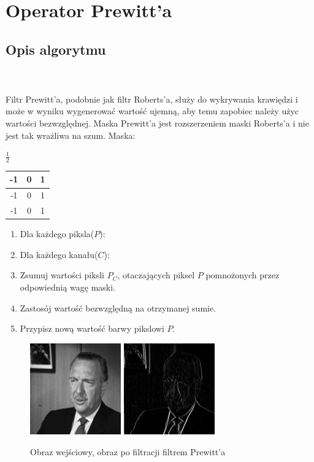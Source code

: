 \documentclass[final,a4paper,openany,12pt]{mwbk}
\begin{document}
\newpage


\section{Operator Prewitt'a}
\subsection*{Opis algorytmu}
\hfill
\\\\
\indent Filtr Prewitt'a, podobnie jak filtr Roberts'a, służy do wykrywania krawiędzi i może w wyniku wygenerować wartość ujemną, aby temu zapobiec należy użyc wartości bezwzględnej. Maska Prewitt'a jest rozszerzeniem maski Roberts'a i nie jest tak wrażliwa na szum. Maska:

\begin{center}
	$\frac{1}{2}$
	\begin{tabular}{|c|c|c|}
		\hline
		-1 & 0 & 1\\
		\hline
		-1 & 0 & 1\\
		\hline
		-1 & 0 & 1\\
		\hline
	\end{tabular}
\end{center}

\begin{enumerate}
	\item Dla każdego piksla($P$):
	\item Dla każdego kanału($C$):
	\item Zsumuj wartości piksli $P_C$, otaczających piksel $P$ pomnożonych przez odpowiednią wagę maski.
	\item Zastosój wartość bezwzględną na otrzymanej sumie.
	\item Przypisz nową wartość barwy pikslowi $P$.
\end{enumerate}

\begin{figure}[H]
	\begin{center}
		\includegraphics[width=0.35\textwidth]{gentelman_gray}
		\includegraphics[width=0.35\textwidth]{gentelman_gray_highpassPrewitt_result}
	\end{center}
	\caption{Obraz wejściowy, obraz po filtracji filtrem Prewitt'a}
\end{figure}
\end{document}
